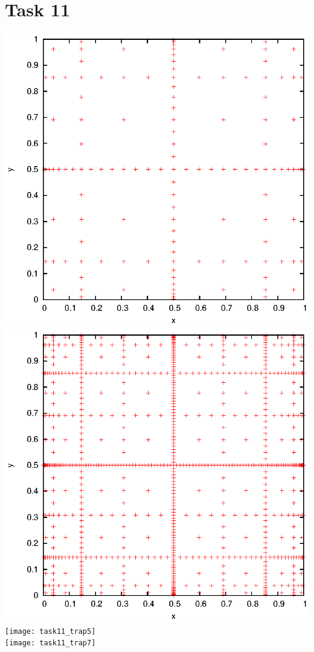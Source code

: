 \documentclass[]{article}
\begin{document}
\section*{Task 11}
\includegraphics{task11_cc5}\\
\includegraphics{task11_cc7}\\
\texttt{[image: task11\_trap5]}\\
\texttt{[image: task11\_trap7]}\\
\end{document}
